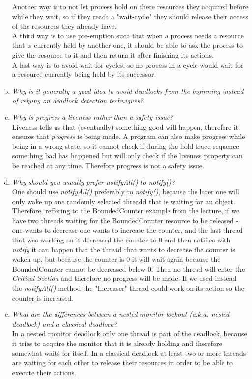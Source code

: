 \documentclass{report}
\begin{document}
\begin{enumerate}[a)]
			Another way is to not let process hold on there resources they acquired before while they wait, so if they reach a "wait-cycle" they should release their access of the resources they already have. \\
			A third way is to use pre-emption such that when a process needs a resource that is currently held by another one, it should be able to ask the process to give the resource to it and then return it after finishing its actions. \\
			A last way is to avoid wait-for-cycles, so no process in a cycle would wait for a resource currently being held by its successor.
			\item \textit{Why is it generally a good idea to avoid deadlocks from the beginning instead of relying on deadlock detection techniques?} \\
			\item \textit{Why is progress a liveness rather than a safety issue?} \\
			Liveness tells us that (eventually) something good will happen, therefore it ensures that \textit{progress} is being made. A program can also make progress while being in a wrong state, so it cannot check if during the hold trace sequence something bad has happened but will only check if the liveness property can be reached at any time. Therefore progress is not a safety issue.
			\item \textit{Why should you usually prefer notifyAll() to notify()?} \\
			One should use \textit{notifyAll()} preferably to \textit{notify()}, because the later one will only wake up one randomly selected threadd that is waiting for an object. Therefore, reffering to the BoundedCounter example from the lecture, if we have two threads waiting for the BoundedCounter resource to be released - one wants to decrease one wants to increase the counter, and the last thread that was working on it decreased the counter to 0 and then notifies with \textit{notify} it can happen that the thread that wants to decrease the counter is woken up, but because the counter is 0 it will wait again because the BoundedCounter cannot be decreased below 0. Then no thread will enter the \textit{Critical Section} and therefore no progress will be made. If we used instead the \textit{notifyAll()} method the "Increaser" thread could work on its action so the counter is increased.
			\item \textit{What are the differences between a nested monitor lockout (a.k.a. nested deadlock) and a classical deadlock?} \\
			In a nested monitor deadlock only one thread is part of the deadlock, because it tries to acquire the monitor that it is already holding and therefore somewhat waits for itself. In a classical deadlock at least two or more threads are waiting for each other to release their resources in order to be able to execute their actions.
		\end{enumerate}
	\closesection
	
\end{document}
